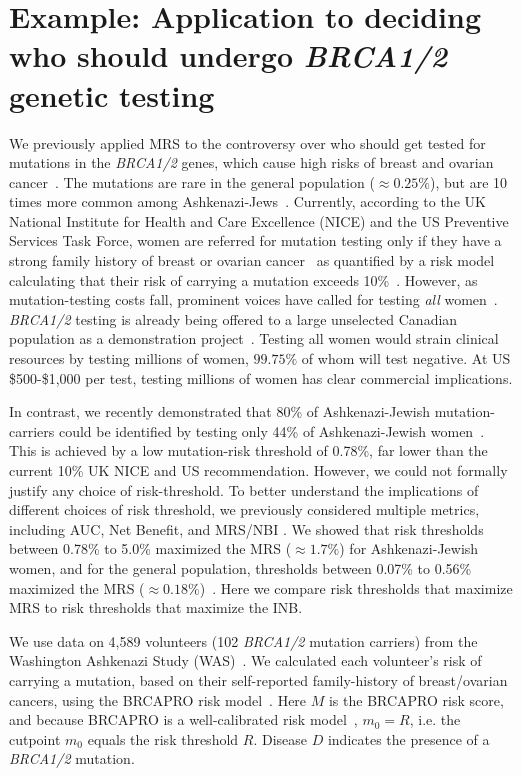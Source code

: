 \documentclass[11pt]{article}
\begin{document}
\section{Example: Application to deciding who should undergo \textit{BRCA1/2} genetic testing}

We previously applied MRS to the controversy over who should get tested for mutations in the \textit{BRCA1/2} genes, which cause high risks of breast and ovarian cancer~\citep{katki}.  The mutations are rare in the general population ($\approx0.25\%$), but are 10 times more common among Ashkenazi-Jews~\citep{STRUEWING1997}.  Currently, according to the UK National Institute for Health and Care Excellence (NICE) and the US Preventive Services Task Force, women are referred for mutation testing only if they have a strong family history of breast or ovarian cancer~\citep{Moyer2014} as quantified by a risk model calculating that their risk of carrying a mutation exceeds 10\%~\citep{NICE2017}.  However, as mutation-testing costs fall, prominent voices have called for testing \textit{all} women~\citep{King2014,GenomeWeb2017}.  \textit{BRCA1/2} testing is already being offered to a large unselected Canadian population as a demonstration project~\citep{GenomeWeb2017a}.  Testing all women would strain clinical resources by testing millions of women, $99.75\%$ of whom will test negative.  At US \$500-\$1,000 per test, testing millions of women has clear commercial implications.  

In contrast, we recently demonstrated that 80\% of Ashkenazi-Jewish mutation-carriers could be identified by testing only 44\% of Ashkenazi-Jewish women~\citep{Best2017}.  This is achieved by a low mutation-risk threshold of 0.78\%, far lower than the current 10\% UK NICE and US recommendation.   However, we could not formally justify any choice of risk-threshold.  To better understand the implications of different choices of risk threshold, we previously considered multiple metrics, including AUC, Net Benefit, and MRS/NBI \citep{katki}.  We showed that risk thresholds between 0.78\% to 5.0\% maximized the MRS ($\approx 1.7\%$) for Ashkenazi-Jewish women, and for the general population, thresholds between 0.07\% to 0.56\% maximized the MRS ($\approx 0.18\%$)~\citep{katki}.  Here we compare risk thresholds that maximize MRS to risk thresholds that maximize the INB.

We use data on 4,589 volunteers (102 \textit{BRCA1/2} mutation carriers) from the Washington Ashkenazi Study (WAS)~\citep{STRUEWING1997}.  We calculated each volunteer's risk of carrying a mutation, based on their self-reported family-history of breast/ovarian cancers, using the BRCAPRO risk model~\citep{Parmigiani1998}.  Here $M$ is the BRCAPRO risk score, and because BRCAPRO is a well-calibrated risk model~\citep{Best2017}, $m_0=R$, i.e. the cutpoint $m_0$ equals the risk threshold $R$. Disease $D$ indicates the presence of a \textit{BRCA1/2} mutation.
\end{document}
